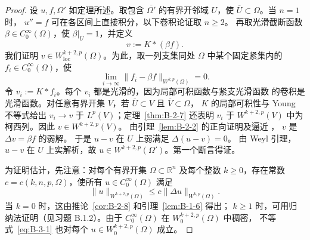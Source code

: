 \begin{proof}
设 $u,f,\Omega'$ 如定理所述。取包含 $\overline{\Omega'}$ 的有界开邻域
$U$，使 $\overline U\subset\Omega$。当 $n=1$ 时，
$u''=f$ 可在各区间上直接积分，以下卷积论证取 $n\ge2$。
再取光滑截断函数
$\beta\in C^\infty_0(\Omega)$，使 $\beta|_U=1$，并定义
\[
  v:=K*(\beta f).
\]
我们证明 $v\in W^{k+2,p}_{\mathrm{loc}}(\Omega)$。为此，取一列支集同处
$\Omega$ 中某个固定紧集内的 $f_i\in C^\infty_0(\Omega)$，使
\[
  \lim_{i\to\infty}\|f_i-\beta f\|_{W^{k,p}(\Omega)}=0.
\]
令 $v_i:=K*f_i$。每个 $v_i$ 都是光滑的，因为局部可积函数与紧支光滑函数
的卷积是光滑函数。对任意有界开集 $V$，若
$\overline U\subset V$ 且 $\overline V\subset\Omega$，
$K$ 的局部可积性与 Young 不等式给出
$v_i\to v$ 于 $L^p(V)$；定理~\ref{thm:B-2-7} 还表明
$v_i$ 于 $W^{k+2,p}(V)$ 中为柯西列。因此
$v\in W^{k+2,p}(V)$。
由引理~\ref{lem:B-2-2} 的正向证明及逼近
，
$v$ 是 $\Delta v=\beta f$ 的弱解。
于是 $u-v$ 在 $U$ 上弱满足 $\Delta(u-v)=0$。
由 Weyl 引理，$u-v$ 在 $U$ 上实解析，故
$u\in W^{k+2,p}(\Omega')$。第一个断言得证。

为证明估计，先注意：对每个有界开集 $\Omega\subset\mathbb R^n$ 及每个整数
$k\ge0$，存在常数 $c=c(k,n,p,\Omega)$，使所有
$u\in C^\infty_0(\Omega)$ 满足
\begin{equation}\label{eq:B-3-1}
  \|u\|_{W^{k+2,p}(\Omega)}
  \le c\|\Delta u\|_{W^{k,p}(\Omega)}.
\end{equation}
当 $k=0$ 时，这由推论~\ref{cor:B-2-8} 和引理~\ref{lem:B-1-6} 得出；
$k\ge1$ 时，可用归纳法证明（见习题 B.1.2）。由于
$C^\infty_0(\Omega)$ 在 $W^{k+2,p}_0(\Omega)$ 中稠密，
不等式~\eqref{eq:B-3-1} 也对每个
$u\in W^{k+2,p}_0(\Omega)$ 成立。


\end{proof}
